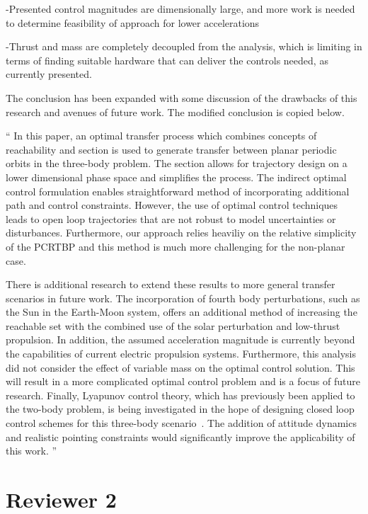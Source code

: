 \documentclass[11pt]{article}
\newenvironment{correction}{\begin{list}{}{\setlength{\leftmargin}{1cm}\setlength{\rightmargin}{1cm}}\vspace{\parsep}\item[]``}{''\end{list}}
\begin{document}
\begin{enumerate}
\begin{itshape}
-Presented control magnitudes are dimensionally large, and more work is needed to determine feasibility of approach for lower accelerations

-Thrust and mass are completely decoupled from the analysis, which is limiting in terms of finding suitable hardware that can deliver the controls needed, as currently presented.
\end{itshape}

The conclusion has been expanded with some discussion of the drawbacks of this research and avenues of future work.
The modified conclusion is copied below.

\begin{correction}
In this paper, an optimal transfer process which combines concepts of reachability and \Poincare section is used to generate transfer between planar periodic orbits in the three-body problem.
The \Poincare section allows for trajectory design on a lower dimensional phase space and simplifies the process.
The indirect optimal control formulation enables straightforward method of incorporating additional path and control constraints.
However, the use of optimal control techniques leads to open loop trajectories that are not robust to model uncertainties or disturbances.
Furthermore, our approach relies heaviliy on the relative simplicity of the PCRTBP and this method is much more challenging for the non-planar case.

There is additional research to extend these results to more general transfer scenarios in future work.
The incorporation of fourth body perturbations, such as the Sun in the Earth-Moon system, offers an additional method of increasing the reachable set with the combined use of the solar perturbation and low-thrust propulsion.
In addition, the assumed acceleration magnitude is currently beyond the capabilities of current electric propulsion systems.
Furthermore, this analysis did not consider the effect of variable mass on the optimal control solution.
This will result in a more complicated optimal control problem and is a focus of future research.
Finally, Lyapunov control theory, which has previously been applied to the two-body problem, is being investigated in the hope of designing closed loop control schemes for this three-body scenario~\cite{chang2002}.
The addition of attitude dynamics and realistic pointing constraints would significantly improve the applicability of this work.
\end{correction}
\end{enumerate}
\section*{Reviewer 2}
\end{document}
